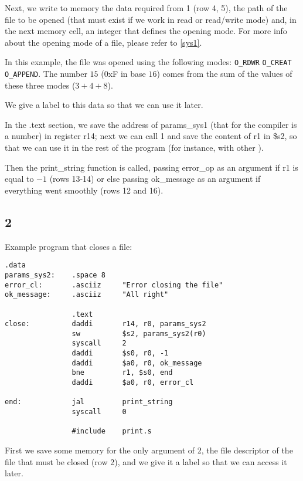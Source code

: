 Next, we write to memory the data required from \SC{} 1 (row 4, 5), the path of
the file to be opened (that must exist if we work in read or read/write mode)
and, in the next memory cell, an integer that defines the opening mode. For more
info about the opening mode of a file, please refer to \ref{sys1}.

In this example, the file was opened using the following modes: 
\texttt{O\_RDWR} \textbar{} \texttt{O\_CREAT} \textbar{} \texttt{O\_APPEND}. The
number $15$ (0xF in base $16$) comes from the sum of the values of these three
modes ($3 + 4 + 8$).

We give a label to this data so that we can use it later.

In the .text section, we save the address of params\_sys1 (that for the compiler
is a number) in register r14; next we can call \SC{} 1 and save the content of
r1 in \$s2, so that we can use it in the rest of the program (for instance, with
other \SC{}).

Then the print\_string function is called, passing error\_op as an argument if
r1 is equal to $-1$ (rows 13-14) or else passing ok\_message as an argument if
everything went smoothly (rows 12 and 16).

\subsection{\SC{} 2}
Example program that closes a file:
\begin{lstlisting}[caption={\SC{} 2 example}, label={code:syscall2}, style={mips}]
                .data
params_sys2:    .space 8
error_cl:       .asciiz     "Error closing the file"
ok_message:     .asciiz     "All right"

                .text
close:          daddi       r14, r0, params_sys2        
                sw          $s2, params_sys2(r0)    
                syscall     2            
                daddi       $s0, r0, -1        
                daddi       $a0, r0, ok_message            
                bne         r1, $s0, end            
                daddi       $a0, r0, error_cl

end:            jal         print_string
                syscall     0
    
                #include    print.s         
\end{lstlisting}
First we save some memory for the only argument of \SC{} 2, the file descriptor
of the file that must be closed (row 2), and we give it a label so that we can
access it later.

